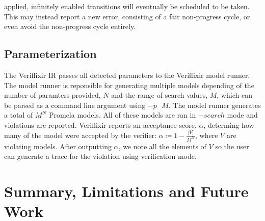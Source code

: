 applied, infinitely enabled transitions will eventually be scheduled to be taken. This may instead report a new error, consisting of a fair non-progress cycle, or even avoid the non-progress cycle entirely.  
\subsection{Parameterization}
The Veriflixir IR passes all detected parameters to the Veriflixir model runner. The model runner is reponsible for generating multiple models depending of the number of paramters provided, $N$ and the range of search values, $M$, which can be parsed as a command line argument using $-p\text{ }M$. The model runner generates a total of $M^N$ Promela models. All of these models are ran in $-search$ mode and violations are reported. Veriflixir reports an acceptance score, $\alpha$, determing how many of the model were accepted by the verifier: $\alpha \coloneq 1 - \frac{|V|}{M^N}$, where $V$ are violating models. After outputting $\alpha$, we note all the elements of $V$ so the user can generate a trace for the violation using verification mode.

\section{Summary, Limitations and Future Work}
